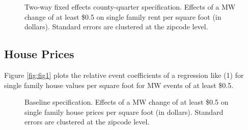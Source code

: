 \documentclass{article}
\begin{document}
\begin{figure}[h!]
    \centering
    \caption{Two-way fixed effects county-quarter specification. Effects of a MW change of at least \$0.5 on single family rent per square foot (in dollars). Standard errors are clustered at the zipcode level.}
    \label{fig:fig3}
\end{figure}

\subsection{House Prices}

Figure \ref{fig:fig1} plots the relative event coefficients of a regression like (1) for single family house values per square foot for MW events of at least \$0.5. 

\begin{figure}[h!]
    \centering
    \caption{Baseline specification. Effects of a MW change of at least \$0.5 on single family house prices per square foot (in dollars). Standard errors are clustered at the zipcode level.}
    \label{fig:fig4}
\end{figure}
\end{document}
